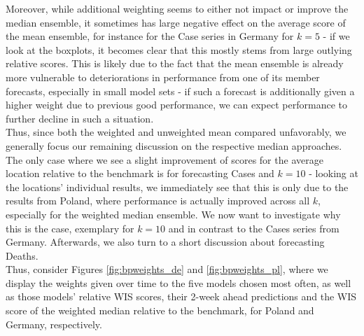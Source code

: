 Moreover, while additional weighting seems to either not impact or improve the median ensemble, it sometimes has large negative effect on the average score of the mean ensemble, for instance for the Case series in Germany for $k = 5$ - if we look at the boxplots, it becomes clear that this mostly stems from large outlying relative scores. This is likely due to the fact that the mean ensemble is already more vulnerable to deteriorations in performance from one of its member forecasts, especially in small model sets - if such a forecast is additionally given a higher weight due to previous good performance, we can expect performance to further decline in such a situation.\\
Thus, since both the weighted and unweighted mean compared unfavorably, we generally focus our remaining discussion on the respective median approaches. \medskip\\
The only case where we see a slight improvement of scores for the average location relative to the benchmark is for forecasting Cases and $k = 10$ - looking at the locations' individual results, we immediately see that this is only due to the results from Poland, where performance is actually improved across all $k$, especially for the weighted median ensemble. We now want to investigate why this is the case, exemplary for $k = 10$ and in contrast to the Cases series from Germany. Afterwards, we also turn to a short discussion about forecasting Deaths.\\
Thus, consider Figures \ref{fig:bpweights_de} and \ref{fig:bpweights_pl}, where we display the weights given over time to the five models chosen most often, as well as those models' relative WIS scores, their 2-week ahead predictions and the WIS score of the weighted median relative to the benchmark, for Poland and Germany, respectively.\\
